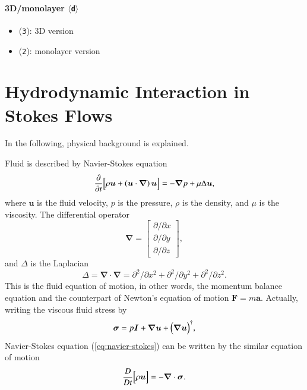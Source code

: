 \documentclass{book}
\begin{document}
\paragraph{3D/monolayer $\langle${\tt d}$\rangle$}
\begin{itemize}
\item ({\tt 3}): 3D version
\item ({\tt 2}): monolayer version
\end{itemize}


\section{Hydrodynamic Interaction in Stokes Flows}
In the following, physical background is explained.

Fluid is described by Navier-Stokes equation
\begin{equation}
  \frac{\partial}{\partial t}
  \Bigl[
    \rho
    \bm{u}
    +
    \left(
      \bm{u}
      \cdot
      \bm{\nabla}
    \right)
    \bm{u}
  \Bigr]
  =
  -
  \bm{\nabla}
  p
  +
  \mu
  \Delta
  \bm{u}
  ,
  \label{eq:navier-stokes}
\end{equation}
where $\bm{u}$ is the fluid velocity,
$p$ is the pressure, $\rho$ is the density,
and $\mu$ is the viscosity.
The differential operator
\begin{equation}
  \bm{\nabla}
  =
  \left[
    \begin{array}{c}
      \partial/\partial x\\
      \partial/\partial y\\
      \partial/\partial z
    \end{array}
  \right]
  ,
\end{equation}
and $\Delta$ is the Laplacian
\begin{equation}
  \Delta
  =
  \bm{\nabla}
  \cdot
  \bm{\nabla}
  =
  \partial^2/\partial x^2
  +
  \partial^2/\partial y^2
  +
  \partial^2/\partial z^2
  .
\end{equation}
This is the fluid equation of motion, in other words,
the momentum balance equation and the counterpart of
Newton's equation of motion $\bm{F} = m\bm{a}$.
Actually, writing the viscous fluid stress by
\begin{equation}
  \bm{\sigma}
  =
  p
  \bm{I}
  +
  \bm{\nabla}\bm{u}
  +
  \Bigl(
  \bm{\nabla}\bm{u}
  \Bigr)^\dagger
  ,
\end{equation}
Navier-Stokes equation (\ref{eq:navier-stokes}) can be written by
the similar equation of motion
\begin{equation}
  \frac{D}{D t}
  \Bigl[
    \rho
    \bm{u}
  \Bigr]
  =
  -
  \bm{\nabla}
  \cdot
  \bm{\sigma}
  .
\end{equation}
\end{document}
